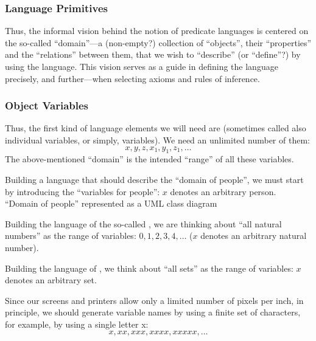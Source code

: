 \subsubsection*{Language Primitives}

Thus, the informal vision behind the notion of predicate languages is centered on the so-called ``domain''---a (non-empty?) collection of ``objects'', their ``properties'' and the ``relations'' between them, that we wish to ``describe'' (or ``define''?) by using the language.
This vision serves as a guide in defining the language precisely, and further---when selecting axioms and rules of inference.

\subsubsection*{Object Variables}

Thus, the first kind of language elements we will need are  (sometimes called also individual variables, or simply, variables).
We need an unlimited number of them:
\[
x, y, z, x_1, y_1, z_1, \ldots
\]
The above-mentioned ``domain'' is the intended ``range'' of all these variables.

\begin{example}
Building a language that should describe the ``domain of people'', we must start by introducing the ``variables for people'': \(x\) denotes an arbitrary person.
``Domain of people'' represented as a UML class diagram
\end{example}

\begin{example}
Building the language of the so-called , we are thinking about ``all natural numbers'' as the range of variables: \(0, 1, 2, 3, 4, \ldots\) (\(x\) denotes an arbitrary natural number).
\end{example}

\begin{example}
Building the language of , we think about ``all sets'' as the range of variables: \(x\) denotes an arbitrary set.
\end{example}

\begin{note}
Since our screens and printers allow only a limited number of pixels per inch, in principle, we
should generate variable names by using a finite set of characters, for example, by using a single letter x:
\[
x, xx, xxx, xxxx, xxxxx, \ldots
\]
\end{note}

